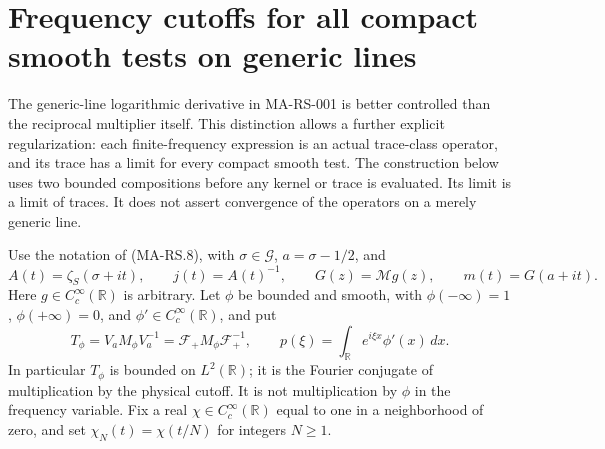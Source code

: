\section{Frequency cutoffs for all compact smooth tests on generic lines}
\label{sec:regularized-frequency}

The generic-line logarithmic derivative in MA-RS-001 is better
controlled than the reciprocal multiplier itself. This distinction
allows a further explicit regularization: each finite-frequency
expression is an actual trace-class operator, and its trace has a
limit for every compact smooth test. The construction below uses two
bounded compositions before any kernel or trace is evaluated.
Its limit is a limit of traces. It does not assert convergence of
the operators on a merely generic line.

Use the notation of (MA-RS.8), with
$\sigma\in\mathscr G$, $a=\sigma-1/2$, and
\[
 A(t)=\zeta_S(\sigma+it),\qquad
 j(t)=A(t)^{-1},\qquad
 G(z)=\mathcal Mg(z),\qquad m(t)=G(a+it).
 \tag{MA-RS.52}
\]
Here $g\in C_c^\infty(\mathbb R)$ is arbitrary.
Let $\phi$ be bounded and smooth, with
$\phi(-\infty)=1$, $\phi(+\infty)=0$, and
$\phi'\in C_c^\infty(\mathbb R)$, and put
\[
 T_\phi=V_aM_\phi V_a^{-1}
        =\mathcal F_+M_\phi\mathcal F_+^{-1},
 \qquad
 p(\xi)=\int_{\mathbb R}e^{i\xi x}\phi'(x)\,dx.
 \tag{MA-RS.53}
\]
In particular $T_\phi$ is bounded on $L^2(\mathbb R)$; it
is the Fourier conjugate of multiplication by the physical cutoff.
It is not multiplication by $\phi$ in the frequency variable.
Fix a real $\chi\in C_c^\infty(\mathbb R)$ equal to one in a
neighborhood of zero, and set $\chi_N(t)=\chi(t/N)$ for integers
$N\ge1$.


